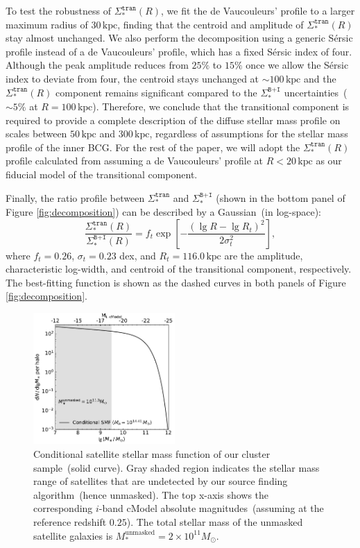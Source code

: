 \documentclass[fleqn,usenatbib]{mnras}
\newcommand{\sigbi}{\Sigma_*^{\texttt{B+I}}}
\newcommand{\sigtr}{\Sigma_*^{\texttt{tran}}}
\newcommand{\kpc}{\mathrm{kpc}}
\newcommand{\msol}{M_{\odot}}
\begin{document}
To test the robustness of $\sigtr(R)$, we fit the de Vaucouleurs' profile
to a larger maximum radius of $30\,\kpc$, finding that the centroid and
amplitude of $\sigtr(R)$ stay almost unchanged.  We also perform the
decomposition using a generic S\'ersic profile instead of a de Vaucouleurs'
profile, which has a fixed S\'ersic index of four.
Although the peak amplitude reduces from $25\%$ to $15\%$ once we allow the
S\'ersic index to deviate from four, the centroid stays unchanged at
${\sim}100\,\kpc$ and the $\sigtr(R)$ component remains significant
compared to the $\sigbi$ uncertainties~(${\sim}5\%$ at $R{=}100\,\kpc$).
Therefore, we conclude that the transitional component is required to
provide a complete description of the diffuse stellar mass profile on
scales between $50\,\kpc$ and $300\,\kpc$, regardless of assumptions for
the stellar mass profile of the inner BCG. For the rest of the paper, we
will adopt the $\sigtr(R)$ profile calculated from assuming a de
Vaucouleurs' profile at $R{<}20\,\kpc$ as our fiducial model of the
transitional component.


Finally, the ratio profile between $\sigtr$ and $\sigbi$ (shown in the
bottom panel of Figure \ref{fig:decomposition}) can be described by a
Gaussian~(in log-space):
\begin{equation}
\frac{\sigtr(R)}{\sigbi(R)} =  f_{t} \exp \left[ - \frac{(\lg R-\lg
	R_t)^2}{2\sigma_t^2}\right] ,
\label{eqn:sigtr}
\end{equation}
where $f_t{=}0.26$, $\sigma_t{=}0.23$ dex, and $R_t{=}116.0\,\kpc$ are the
amplitude, characteristic log-width, and centroid of the transitional
component, respectively.  The best-fitting function is shown as the
dashed curves in both panels of Figure \ref{fig:decomposition}.

\begin{figure}
    \includegraphics[width=0.48\textwidth]{fig/sat_icl_mass_estimation.pdf}
    \caption{Conditional satellite stellar mass function of our cluster
    sample~(solid curve). Gray shaded region indicates the stellar mass
    range of satellites that are undetected by our source finding
    algorithm~(hence unmasked). The top x-axis shows the corresponding
    $i$-band cModel absolute magnitudes~(assuming at the reference redshift
    $0.25$). The total stellar mass of the unmasked satellite galaxies is
    $M_*^{\mathrm{unmasked}}=2{\times} 10^{11}\msol$. \label{fig:csmf} }
\end{figure}
\end{document}
